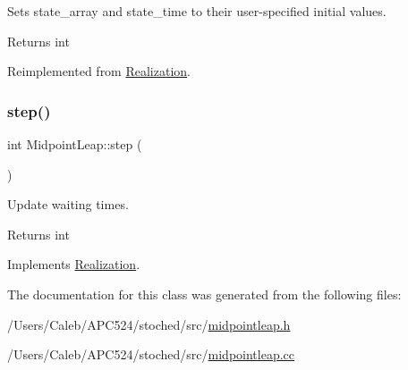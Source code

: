 Sets state\+\_\+array and state\+\_\+time to their user-\/specified initial values. 

\begin{DoxyReturn}{Returns}
int 
\end{DoxyReturn}


Reimplemented from \hyperlink{class_realization_a391a89af7574a9053f53f8a299c2cc70}{Realization}.

\mbox{\label{class_midpoint_leap_a8afc1a6a8777157f7b42ec08a848b564}} 
\subsubsection{\texorpdfstring{step()}{step()}}
{\footnotesize\ttfamily int Midpoint\+Leap\+::step (\begin{DoxyParamCaption}{ }\end{DoxyParamCaption})\hspace{0.3cm}{\ttfamily [virtual]}}



Update waiting times. 

\begin{DoxyReturn}{Returns}
int 
\end{DoxyReturn}


Implements \hyperlink{class_realization_a9949217117927b149850288f3b74c9ef}{Realization}.



The documentation for this class was generated from the following files\+:\begin{DoxyCompactItemize}
\item 
/\+Users/\+Caleb/\+A\+P\+C524/stoched/src/\hyperlink{midpointleap_8h}{midpointleap.\+h}\item 
/\+Users/\+Caleb/\+A\+P\+C524/stoched/src/\hyperlink{midpointleap_8cc}{midpointleap.\+cc}\end{DoxyCompactItemize}
